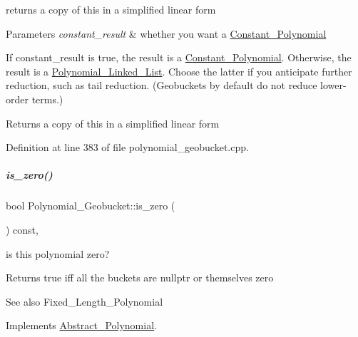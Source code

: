 returns a copy of {\ttfamily this} in a simplified linear form 


\begin{DoxyParams}{Parameters}
{\em constant\+\_\+result} & whether you want a \hyperlink{group__polygroup_class_constant___polynomial}{Constant\+\_\+\+Polynomial}\\
\hline
\end{DoxyParams}
If {\ttfamily constant\+\_\+result} is {\ttfamily true}, the result is a {\ttfamily \hyperlink{group__polygroup_class_constant___polynomial}{Constant\+\_\+\+Polynomial}}. Otherwise, the result is a {\ttfamily \hyperlink{group__polygroup_class_polynomial___linked___list}{Polynomial\+\_\+\+Linked\+\_\+\+List}}. Choose the latter if you anticipate further reduction, such as tail reduction. (Geobuckets by default do not reduce lower-\/order terms.) \begin{DoxyReturn}{Returns}
a copy of {\ttfamily this} in a simplified linear form 
\end{DoxyReturn}


Definition at line 383 of file polynomial\+\_\+geobucket.\+cpp.

\mbox{\label{group__polygroup_ac71d7f640ebdf764c5b81bf8d9a5686d}} 
\subparagraph{\texorpdfstring{is\+\_\+zero()}{is\_zero()}}
{\footnotesize\ttfamily bool Polynomial\+\_\+\+Geobucket\+::is\+\_\+zero (\begin{DoxyParamCaption}{ }\end{DoxyParamCaption}) const\hspace{0.3cm}{\ttfamily [override]}, {\ttfamily [virtual]}}



is this polynomial zero? 

\begin{DoxyReturn}{Returns}
{\ttfamily true} iff all the buckets are {\ttfamily nullptr} or themselves zero 
\end{DoxyReturn}
\begin{DoxySeeAlso}{See also}
Fixed\+\_\+\+Length\+\_\+\+Polynomial 
\end{DoxySeeAlso}


Implements \hyperlink{group__polygroup_afb4895702dd56895a792850a831c2f51}{Abstract\+\_\+\+Polynomial}.



